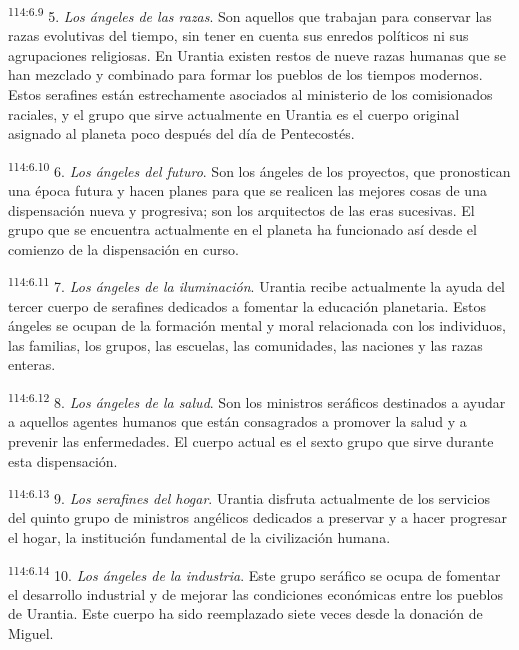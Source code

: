 \par
\textsuperscript{114:6.9} 5. \textit{Los ángeles de las razas}. Son aquellos que trabajan para conservar las razas evolutivas del tiempo, sin tener en cuenta sus enredos políticos ni sus agrupaciones religiosas. En Urantia existen restos de nueve razas humanas que se han mezclado y combinado para formar los pueblos de los tiempos modernos. Estos serafines están estrechamente asociados al ministerio de los comisionados raciales, y el grupo que sirve actualmente en Urantia es el cuerpo original asignado al planeta poco después del día de Pentecostés.

\par
\textsuperscript{114:6.10} 6. \textit{Los ángeles del futuro}. Son los ángeles de los proyectos, que pronostican una época futura y hacen planes para que se realicen las mejores cosas de una dispensación nueva y progresiva; son los arquitectos de las eras sucesivas. El grupo que se encuentra actualmente en el planeta ha funcionado así desde el comienzo de la dispensación en curso.

\par
\textsuperscript{114:6.11} 7. \textit{Los ángeles de la iluminación}. Urantia recibe actualmente la ayuda del tercer cuerpo de serafines dedicados a fomentar la educación planetaria. Estos ángeles se ocupan de la formación mental y moral relacionada con los individuos, las familias, los grupos, las escuelas, las comunidades, las naciones y las razas enteras.

\par
\textsuperscript{114:6.12} 8. \textit{Los ángeles de la salud}. Son los ministros seráficos destinados a ayudar a aquellos agentes humanos que están consagrados a promover la salud y a prevenir las enfermedades. El cuerpo actual es el sexto grupo que sirve durante esta dispensación.

\par
\textsuperscript{114:6.13} 9. \textit{Los serafines del hogar}. Urantia disfruta actualmente de los servicios del quinto grupo de ministros angélicos dedicados a preservar y a hacer progresar el hogar, la institución fundamental de la civilización humana.

\par
\textsuperscript{114:6.14} 10. \textit{Los ángeles de la industria}. Este grupo seráfico se ocupa de fomentar el desarrollo industrial y de mejorar las condiciones económicas entre los pueblos de Urantia. Este cuerpo ha sido reemplazado siete veces desde la donación de Miguel.

